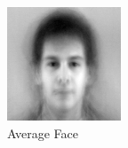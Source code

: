 \documentclass[aps,letterpaper,10pt]{article}
\begin{document}


\begin{figure}[!p]
\centering
\begin{minipage}{.3\textwidth}
\centering
\includegraphics[width=\textwidth]{eigenfaces/avgface.png}
\caption{Average Face}
\label{fig:11-2a}
\end{minipage}
\begin{minipage}{.75\textwidth}
\centering
{}\hfill
{}\hfill

\end{minipage}
\end{figure}
\end{document}
